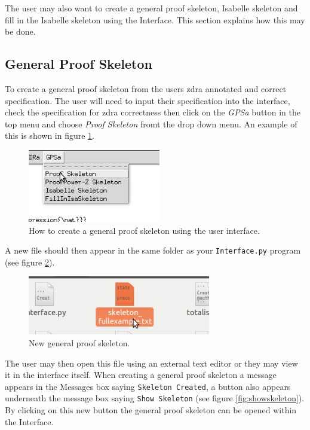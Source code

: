 The user may also want to create a general proof skeleton, Isabelle skeleton and fill in the Isabelle skeleton using the Interface. This section explains how this may be done.

\subsection{General Proof Skeleton}

To create a general proof skeleton from the users \gls{zdra} annotated and correct specification. The user will need to input their specification into the interface, check the specification for \gls{zdra} correctness then click on the \emph{GPSa} button in the top menu and choose \emph{Proof Skeleton} fromt the drop down menu. An example of this is shown in figure \ref{fig:gpsabutton}.

\begin{figure}[H]
\centering
\includegraphics[scale=0.5]{Figures/Interface/proofskeleton.png}
\caption{How to create a general proof skeleton using the user interface. \label{fig:gpsabutton}}
\end{figure}

A new file should then appear in the same folder as your \texttt{Interface.py} program (see figure \ref{fig:gpsadoc}).

\begin{figure}[H]
\centering
\includegraphics[scale=0.5]{Figures/Interface/skeletondoc.png}
\caption{New general proof skeleton. \label{fig:gpsadoc}}
\end{figure}

The user may then open this file using an external text editor or they may view it in the interface itself. When creating a general proof skeleton a message appears in the Messages box saying \texttt{Skeleton Created}, a button also appears underneath the message box saying \texttt{Show Skeleton} (see figure \ref{fig:showskeleton}). By clicking on this new button the general proof skeleton can be opened within the Interface. 

